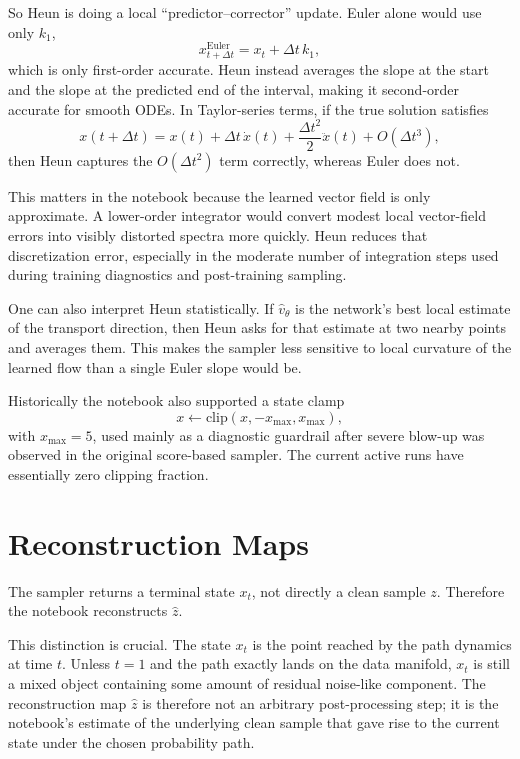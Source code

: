 \documentclass[11pt]{article}
\begin{document}
So Heun is doing a local ``predictor--corrector'' update. Euler alone would use only \(k_1\),
\begin{equation}
  x_{t+\Delta t}^{\mathrm{Euler}} = x_t + \Delta t\,k_1,
\end{equation}
which is only first-order accurate. Heun instead averages the slope at the start and the slope at the predicted end of the interval, making it second-order accurate for smooth ODEs. In Taylor-series terms, if the true solution satisfies
\begin{equation}
  x(t+\Delta t)
  =
  x(t) + \Delta t\,\dot x(t) + \frac{\Delta t^2}{2}\ddot x(t) + O(\Delta t^3),
\end{equation}
then Heun captures the \(O(\Delta t^2)\) term correctly, whereas Euler does not.

This matters in the notebook because the learned vector field is only approximate. A lower-order integrator would convert modest local vector-field errors into visibly distorted spectra more quickly. Heun reduces that discretization error, especially in the moderate number of integration steps used during training diagnostics and post-training sampling.

One can also interpret Heun statistically. If \(\hat v_\theta\) is the network's best local estimate of the transport direction, then Heun asks for that estimate at two nearby points and averages them. This makes the sampler less sensitive to local curvature of the learned flow than a single Euler slope would be.

Historically the notebook also supported a state clamp
\begin{equation}
  x \leftarrow \mathrm{clip}(x, -x_{\max}, x_{\max}),
\end{equation}
with \(x_{\max}=5\), used mainly as a diagnostic guardrail after severe blow-up was observed in the original score-based sampler. The current active runs have essentially zero clipping fraction.

\section{Reconstruction Maps}

The sampler returns a terminal state \(x_t\), not directly a clean sample \(z\). Therefore the notebook reconstructs \(\hat z\).

This distinction is crucial. The state \(x_t\) is the point reached by the path dynamics at time \(t\). Unless \(t=1\) and the path exactly lands on the data manifold, \(x_t\) is still a mixed object containing some amount of residual noise-like component. The reconstruction map \(\hat z\) is therefore not an arbitrary post-processing step; it is the notebook's estimate of the underlying clean sample that gave rise to the current state under the chosen probability path.
\end{document}
